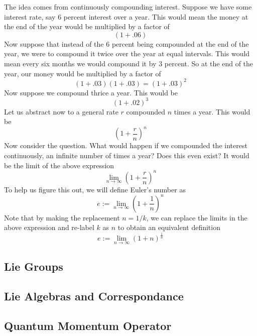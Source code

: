 \documentclass[12pt]{article}
\theoremstyle{definition}
\theoremstyle{remark}
\theoremstyle{example}
\theoremstyle{theorem}
\theoremstyle{lemma}
\begin{document}
The idea comes from continuously compounding interest. Suppose we have some interest rate, say 6 percent interest over a year. This would mean the money at the end of the year would be multiplied by a factor of 
\begin{equation}
	(1+.06)
\end{equation}
Now suppose that instead of the 6 percent being compounded at the end of the year, we were to compound it twice over the year at equal intervals. This would mean every six months we would compound it by 3 percent. So at the end of the year, our money would be multiplied by a factor of
\begin{equation}
	(1+.03)(1+.03)=(1+.03)^2
\end{equation}
Now suppose we compound thrice a year. This would be
\begin{equation}
	(1+.02)^3
\end{equation}
Let us abstract now to a general rate $r$ compounded $n$ times a year. This would be
\begin{equation}
	(1+\frac{r}{n})^n
\end{equation}
Now consider the question. What would happen if we compounded the interest continuously, an infinite number of times a year? Does this even exist? It would be the limit of the above expression
\begin{equation}
	\lim_{n\to\infty}(1+\frac{r}{n})^n
\end{equation}
To help us figure this out, we will define Euler's number as
\begin{equation}
	e:=\lim_{n\to\infty}(1+\frac{1}{n})^n
\end{equation}
Note that by making the replacement $n=1/k$, we can replace the limits in the above expression and re-label $k$ as $n$ to obtain an equivalent definition
\begin{equation}
	e:=\lim_{n\to\infty}(1+n)^{\frac{1}{n}}
\end{equation}


\subsection{Lie Groups}

\subsection{Lie Algebras and Correspondance}

\subsection{Quantum Momentum Operator}
\end{document}

